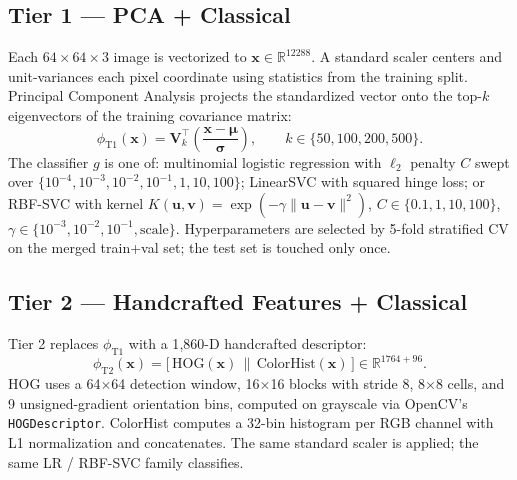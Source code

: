 \documentclass[10pt,letterpaper]{article}
\begin{document}
\subsection{Tier 1 --- PCA + Classical}
Each $64{\times}64{\times}3$ image is vectorized to $\mathbf{x} \in \mathbb{R}^{12288}$. A standard scaler centers and unit-variances each pixel coordinate using statistics from the training split. Principal Component Analysis projects the standardized vector onto the top-$k$ eigenvectors of the training covariance matrix:
\begin{equation}
\phi_\text{T1}(\mathbf{x}) = \mathbf{V}_k^\top \!\left( \frac{\mathbf{x} - \boldsymbol\mu}{\boldsymbol\sigma} \right), \qquad k \in \{50, 100, 200, 500\}.
\end{equation}
The classifier $g$ is one of: multinomial logistic regression with $\ell_2$ penalty $C$ swept over $\{10^{-4}, 10^{-3}, 10^{-2}, 10^{-1}, 1, 10, 100\}$; LinearSVC with squared hinge loss; or RBF-SVC with kernel $K(\mathbf{u}, \mathbf{v}) = \exp(-\gamma \lVert \mathbf{u} - \mathbf{v} \rVert^2)$, $C \in \{0.1, 1, 10, 100\}$, $\gamma \in \{10^{-3}, 10^{-2}, 10^{-1}, \text{scale}\}$. Hyperparameters are selected by 5-fold stratified CV on the merged train+val set; the test set is touched only once.

\subsection{Tier 2 --- Handcrafted Features + Classical}
Tier 2 replaces $\phi_\text{T1}$ with a 1{,}860-D handcrafted descriptor:
\begin{equation}
\phi_\text{T2}(\mathbf{x}) = \big[ \, \text{HOG}(\mathbf{x}) \, \big\| \, \text{ColorHist}(\mathbf{x}) \, \big] \in \mathbb{R}^{1764+96}.
\end{equation}
HOG uses a 64$\times$64 detection window, 16$\times$16 blocks with stride 8, 8$\times$8 cells, and 9 unsigned-gradient orientation bins, computed on grayscale via OpenCV's \texttt{HOGDescriptor}. ColorHist computes a 32-bin histogram per RGB channel with L1 normalization and concatenates. The same standard scaler is applied; the same LR / RBF-SVC family classifies.
\end{document}
